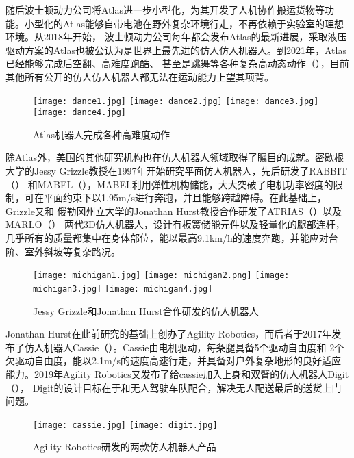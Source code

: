 随后波士顿动力公司将Atlas进一步小型化，为其开发了人机协作搬运货物等功能。小型化的Atlas能够自带电池在野外复杂环境行走，不再依赖于实验室的理想环境。从2018年开始，
波士顿动力公司每年都会发布Atlas的最新进展，采取液压驱动方案的Atlas也被公认为是世界上最先进的仿人仿人机器人。到2021年，Atlas已经能够完成后空翻、高难度跑酷、
甚至是跳舞等各种复杂高动态动作（），目前其他所有公开的仿人仿人机器人都无法在运动能力上望其项背。
\begin{figure}[htbp]
    \centering
    \texttt{[image: dance1.jpg]}
    \texttt{[image: dance2.jpg]}
    \texttt{[image: dance3.jpg]}
    \texttt{[image: dance4.jpg]}
    \caption{\label{fig:atlas_dance}Atlas机器人完成各种高难度动作}
\end{figure}

除Atlas外，美国的其他研究机构也在仿人机器人领域取得了瞩目的成就。密歇根大学的Jessy Grizzle教授在1997年开始研究平面仿人机器人，先后研发了RABBIT（）
和MABEL（），MABEL利用弹性机构储能，大大突破了电机功率密度的限制，可在平面约束下以1.95m/s进行奔跑，并且能够跨越障碍。在此基础上，Grizzle又和
俄勒冈州立大学的Jonathan Hurst教授合作研发了ATRIAS\cite{rezazadeh2015toward}（）以及MARLO\cite{buss2014preliminary}（）
两代3D仿人机器人，设计有板簧储能元件以及轻量化的腿部连杆，几乎所有的质量都集中在身体部位，能以最高9.1km/h的速度奔跑，并能应对台阶、室外斜坡等复杂路况。
\begin{figure}[htbp]
    \centering
        {%
            \texttt{[image: michigan1.jpg]}}
        {%
            \texttt{[image: michigan2.png]}}
        {%
            \texttt{[image: michigan3.jpg]}}
        {%
            \texttt{[image: michigan4.jpg]}}
    \caption{Jessy Grizzle和Jonathan Hurst合作研发的仿人机器人\label{fig:michigan_biped}}
\end{figure}

Jonathan Hurst在此前研究的基础上创办了Agility Robotics，而后者于2017年发布了仿人机器人Cassie\cite{Cassie}（）。Cassie由电机驱动，每条腿具备5个驱动自由度和
2个欠驱动自由度，能以2.1m/s的速度高速行走，并具备对户外复杂地形的良好适应能力。2019年Agility Robotics又发布了给cassie加入上身和双臂的仿人机器人Digit\cite{Digit}（），
Digit的设计目标在于和无人驾驶车队配合，解决无人配送最后的送货上门问题。
\begin{figure}[htbp]
    \centering
        {%
            \texttt{[image: cassie.jpg]}}
    \hspace{1in}            
        {%
            \texttt{[image: digit.jpg]}}
    \caption{Agility Robotics研发的两款仿人机器人产品\label{fig:michigan_biped}}
\end{figure}

